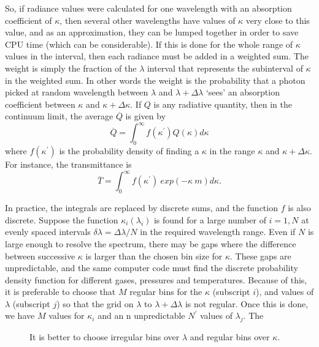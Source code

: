 \documentclass[12pt]{article}
\begin{document}
So, if   radiance values were calculated for one wavelength
with an absorption coefficient of $\kappa$, then several other wavelengths
have values of $\kappa$ very close to this value, and as an approximation, they
can be lumped together in order to save CPU time (which can be considerable). If this is done for the
whole range of $\kappa$ values in the interval, then each radiance
must be added in a weighted sum. The weight is simply the fraction of the
$\lambda$ interval that represents the subinterval of $\kappa$ in the weighted 
sum. In other words the weight is the probability that a photon picked at
random wavelength between $\lambda$ and $\lambda+\Delta \lambda$ `sees' 
an absorption coefficient between $\kappa$ and $\kappa+\Delta \kappa$.
If $Q$ is any radiative quantity, then in the continuum limit, the average
$\overline{Q}$ is given by
\begin{equation}
    \overline{Q}=\int_0^\infty f(\kappa^\prime)  Q(\kappa) d \kappa
\end{equation}
where $f(\kappa^\prime)$ is the probability density of finding a 
$\kappa$ in the range $\kappa$ and $\kappa+\Delta \kappa$.
For instance, the transmittance is
\begin{equation}
    \overline{T}=\int_0^\infty f(\kappa^\prime) \> exp(-\kappa \>m) d \kappa.
\end{equation}

In practice, the integrals are replaced by discrete sums, and the function $f$ is also
discrete.
Suppose the function $\kappa_i(\lambda_i)$ is found for a large number
of $i=1,N$ at evenly spaced intervals $\delta \lambda=\Delta \lambda / N$
in the required wavelength range. 
Even if $N$ is large enough to resolve the spectrum, there may be gaps 
where the difference between successive $\kappa$ is larger than the
chosen bin size for $\kappa$. These gaps are unpredictable, and the
 same computer code must
find the discrete probability density function for different gases,
pressures and temperatures. Because of this, it is preferable to choose
 that  $M$ regular bins  for the $\kappa$ (subscript $i$), and values of $\lambda$ (subscript $j$) so that
the grid on $\lambda$ to $\lambda+\Delta \lambda$ is
not  regular. Once this is done, we have $M$ values
for $\kappa_i$ and an  n unpredictable $N^\prime$ values of $\lambda_j$. The

\vspace*{12.5cm}
\begin{figure}[htb]
\caption{It is better to choose irregular bins over $\lambda$ and regular bins
 over $\kappa$.}
\end{figure} 
\end{document}
